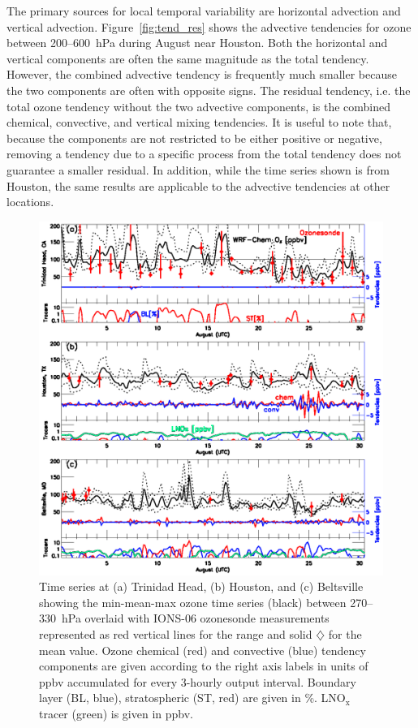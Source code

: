 The primary sources for local temporal variability are horizontal advection and vertical advection.
Figure~\ref{fig:tend_res} shows the advective tendencies for ozone between 200--600~hPa during
August near Houston. Both the horizontal and vertical components are often the same
magnitude as the total tendency. However, the combined advective tendency is frequently much
smaller because the two components are often with opposite signs. The residual
tendency, i.e. the total ozone tendency without the two advective components, is the combined
chemical, convective, and vertical mixing tendencies.
It is useful to note that, because the components are not restricted to be either positive or negative,
removing a tendency due to a specific process from the total tendency does not guarantee a smaller
residual. In addition, while the time series shown is from Houston, the same results are applicable
to the advective tendencies at other locations.

 \begin{figure}
 \noindent\includegraphics[width=40pc]{figures/tendency_ts.eps}
 \caption{Time series at (a) Trinidad Head, (b) Houston, and (c) Beltsville
showing the min-mean-max ozone time series (black) between
270--330~hPa overlaid with IONS-06 ozonesonde measurements
represented as red vertical lines for the range and solid $\diamondsuit$
for the mean value. Ozone chemical (red) and convective (blue) tendency
components are given according to the right axis labels in units
of ppbv accumulated for every 3-hourly output interval. Boundary layer (BL, blue), stratospheric (ST, red) are
given in \%. LNO$_{\mathrm{x}}$ tracer (green) is given in ppbv.}
 \label{fig:tend_ts}
 \end{figure}

